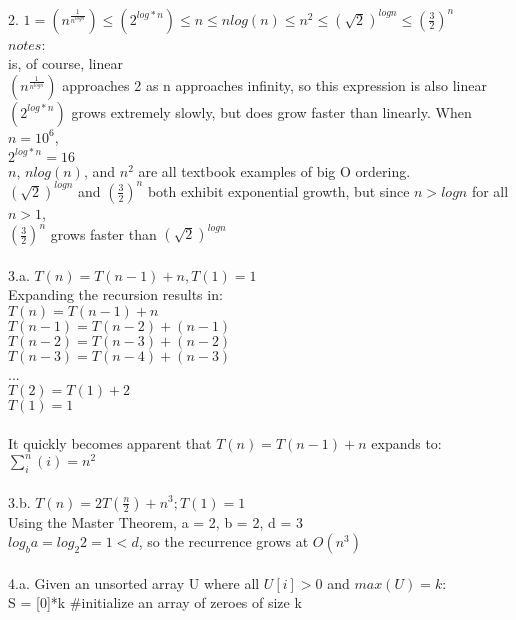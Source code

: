 \documentclass[11pt, oneside]{article}   	%
\begin{document}
\\
2. $1 = (n^ {\frac{1}{n^{log n}}}) \leq (2^{log*n}) \leq  n \leq nlog(n) \leq n^2 \leq (\sqrt{2})^{log n} \leq (\frac{3}{2})^n$\\
\indent $notes$:\\
 is, of course, linear\\
\indent $(n^ {\frac{1}{n^{log n}}})$ approaches 2 as n approaches infinity, so this expression is also linear\\
\indent $(2^{log*n})$ grows extremely slowly, but does grow faster than linearly. When $n = 10^6$,\\ \indent\indent $2^{log*n} = 16$ \\
\indent
$n$, $n log(n)$, and $n^2$ are all textbook examples of big O ordering.\\
\indent $(\sqrt{2})^{log n}$ and $(\frac{3}{2})^n$ both exhibit exponential growth, but since $n > log n$ for all $n>1$,\\
\indent\indent $(\frac{3}{2})^n$ grows faster than $(\sqrt{2})^{log n}$\\
\\
3.a. $T(n) = T(n-1) +n, T(1)=1$\\
\indent
Expanding the recursion results in:\\
\indent\indent
$T(n) = T(n-1) +n$\\
\indent\indent
$T(n-1) = T(n-2) + (n-1)$\\
\indent\indent
$T(n-2) = T(n-3) + (n-2)$\\
\indent\indent
$T(n-3) = T(n-4) + (n-3)$\\
\indent\indent
...\\
\indent\indent
$T(2) = T(1) + 2$\\
\indent\indent
$T(1)=1$\\ \\
\indent\indent It quickly becomes apparent that  $T(n) = T(n-1) +n$ expands to:\\
\indent\indent $\sum_{i}^{n}(i) = n^2$\\
\\
3.b. $T(n) = 2T(\frac{n}{2}) + n^3; T(1)=1$\\
\indent Using the Master Theorem, a = 2, b = 2, d = 3\\
\indent $log_b a = log_2 2 = 1 < d$, so the recurrence grows at $O(n^3)$\\
\\
4.a.  Given an unsorted array U where all $U[i] > 0$ and $max(U) = k$:\\
\indent\indent S = [0]*k \#initialize an array of zeroes of size k\\
\end{document}
